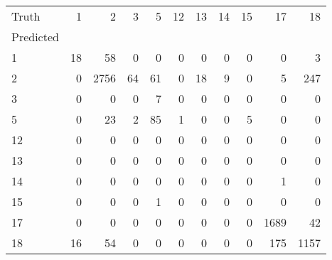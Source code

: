 \begin{tabular}{lrrrrrrrrrr}
\toprule
Truth & 1 & 2 & 3 & 5 & 12 & 13 & 14 & 15 & 17 & 18 \\
Predicted &  &  &  &  &  &  &  &  &  &  \\
\midrule
1 & 18 & 58 & 0 & 0 & 0 & 0 & 0 & 0 & 0 & 3 \\
2 & 0 & 2756 & 64 & 61 & 0 & 18 & 9 & 0 & 5 & 247 \\
3 & 0 & 0 & 0 & 7 & 0 & 0 & 0 & 0 & 0 & 0 \\
5 & 0 & 23 & 2 & 85 & 1 & 0 & 0 & 5 & 0 & 0 \\
12 & 0 & 0 & 0 & 0 & 0 & 0 & 0 & 0 & 0 & 0 \\
13 & 0 & 0 & 0 & 0 & 0 & 0 & 0 & 0 & 0 & 0 \\
14 & 0 & 0 & 0 & 0 & 0 & 0 & 0 & 0 & 1 & 0 \\
15 & 0 & 0 & 0 & 1 & 0 & 0 & 0 & 0 & 0 & 0 \\
17 & 0 & 0 & 0 & 0 & 0 & 0 & 0 & 0 & 1689 & 42 \\
18 & 16 & 54 & 0 & 0 & 0 & 0 & 0 & 0 & 175 & 1157 \\
\bottomrule
\end{tabular}

